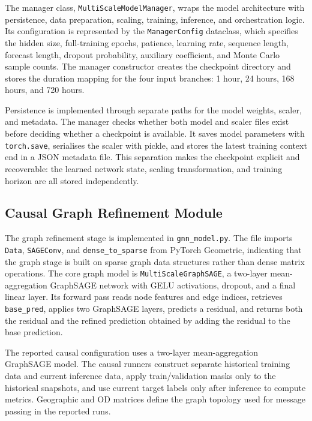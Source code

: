 \documentclass[12pt,a4paper]{report}
\begin{document}
	The manager class, \texttt{MultiScaleModelManager}, wraps the model architecture with persistence, data preparation, scaling, training, inference, and orchestration logic. Its configuration is represented by the \texttt{ManagerConfig} dataclass, which specifies the hidden size, full-training epochs, patience, learning rate, sequence length, forecast length, dropout probability, auxiliary coefficient, and Monte Carlo sample counts. The manager constructor creates the checkpoint directory and stores the duration mapping for the four input branches: 1 hour, 24 hours, 168 hours, and 720 hours.
	
	Persistence is implemented through separate paths for the model weights, scaler, and metadata. The manager checks whether both model and scaler files exist before deciding whether a checkpoint is available. It saves model parameters with \texttt{torch.save}, serialises the scaler with pickle, and stores the latest training context end in a JSON metadata file. This separation makes the checkpoint explicit and recoverable: the learned network state, scaling transformation, and training horizon are all stored independently.
	
\subsection{Causal Graph Refinement Module}
	
	The graph refinement stage is implemented in \texttt{gnn\_model.py}. The file imports \texttt{Data}, \texttt{SAGEConv}, and \texttt{dense\_to\_sparse} from PyTorch Geometric, indicating that the graph stage is built on sparse graph data structures rather than dense matrix operations. The core graph model is \texttt{MultiScaleGraphSAGE}, a two-layer mean-aggregation GraphSAGE network with GELU activations, dropout, and a final linear layer. Its forward pass reads node features and edge indices, retrieves \texttt{base\_pred}, applies two GraphSAGE layers, predicts a residual, and returns both the residual and the refined prediction obtained by adding the residual to the base prediction.
	
The reported causal configuration uses a two-layer mean-aggregation GraphSAGE model. The causal runners construct separate historical training data and current inference data, apply train/validation masks only to the historical snapshots, and use current target labels only after inference to compute metrics. Geographic and OD matrices define the graph topology used for message passing in the reported runs.
	
\end{document}
